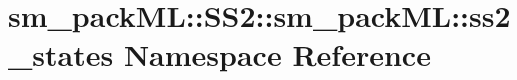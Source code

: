 \hypertarget{namespacesm__packML_1_1SS2_1_1sm__packML_1_1ss2__states}{}\section{sm\+\_\+pack\+ML\+:\+:S\+S2\+:\+:sm\+\_\+pack\+ML\+:\+:ss2\+\_\+states Namespace Reference}
\label{namespacesm__packML_1_1SS2_1_1sm__packML_1_1ss2__states}
